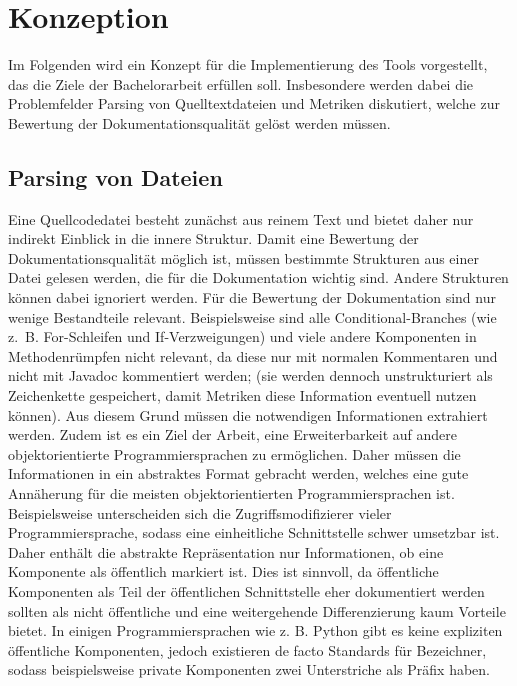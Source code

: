 \begingroup
\renewcommand{\cleardoublepage}{} %
\renewcommand{\clearpage}{}
\chapter{Konzeption}\label{chapter_conception}
\endgroup
Im Folgenden wird ein Konzept für die Implementierung des Tools vorgestellt, das die Ziele der Bachelorarbeit erfüllen soll. Insbesondere werden dabei die Problemfelder Parsing von Quelltextdateien und Metriken diskutiert, welche zur Bewertung der Dokumentationsqualität gelöst werden müssen. 


\hfill
\section{Parsing von Dateien}\label{chapter:parsing}
Eine Quellcodedatei besteht zunächst aus reinem Text und bietet daher nur indirekt Einblick in die innere Struktur. Damit eine Bewertung der Dokumentationsqualität möglich ist, müssen bestimmte Strukturen aus einer Datei gelesen werden, die für die Dokumentation wichtig sind. Andere Strukturen können dabei ignoriert werden. Für die Bewertung der Dokumentation sind nur wenige Bestandteile relevant. Beispielsweise sind alle Conditional-Branches (wie z.~B.  For-Schleifen und If-Verzweigungen) und viele andere Komponenten in Methodenrümpfen nicht relevant, da diese nur mit normalen Kommentaren und nicht mit Javadoc kommentiert werden; (sie werden dennoch unstrukturiert als Zeichenkette gespeichert, damit Metriken diese Information eventuell nutzen können). Aus diesem Grund müssen die notwendigen Informationen extrahiert werden. Zudem ist es ein Ziel der Arbeit, eine Erweiterbarkeit auf andere objektorientierte Programmiersprachen zu ermöglichen. Daher müssen die Informationen in ein abstraktes Format gebracht werden, welches eine gute Annäherung für die meisten objektorientierten Programmiersprachen ist. Beispielsweise unterscheiden sich die Zugriffsmodifizierer vieler Programmiersprache, sodass eine einheitliche Schnittstelle schwer umsetzbar ist. Daher enthält die abstrakte Repräsentation nur Informationen, ob eine Komponente als öffentlich markiert ist. Dies ist sinnvoll, da öffentliche Komponenten als Teil der öffentlichen Schnittstelle eher dokumentiert werden sollten als nicht öffentliche und eine weitergehende Differenzierung kaum Vorteile bietet. In einigen Programmiersprachen wie z. B. Python gibt es keine expliziten öffentliche Komponenten, jedoch existieren de facto Standards für Bezeichner, sodass beispielsweise private Komponenten zwei Unterstriche als Präfix haben.

